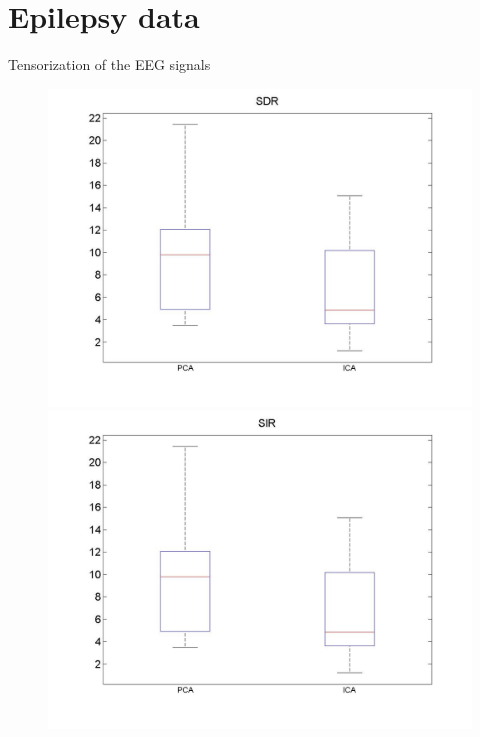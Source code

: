 \documentclass[t,12pt,english
\ifx\beamermode\undefined\else,\beamermode\fi
]{beamer}
\begin{document}
\section{Epilepsy data}

\begin{frame}{Tensorization of the EEG signals}

\begin{figure}[!htbp]
%
\centering
\includegraphics[width=1\textwidth]{15.jpg}
\endminipage\hfill
{}%
\centering
\includegraphics[width=1\textwidth]{16.jpg}
\endminipage\hfill
{}%
\centering

\end{figure}
\end{frame}
\end{document}
